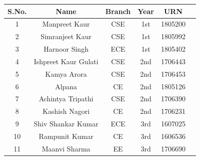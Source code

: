 \documentclass[12pt, a4 paper]{article}
\begin{document}
\begin{table}[h!]
  \begin{center}
    \begin{tabular}{|c|c|c|c|c|c|} 
    \toprule %
      \textbf{S.No.} & \textbf{Name} & \textbf{Branch} & \textbf{Year} & \textbf{URN}\\
      \midrule %
1       &Manpreet Kaur  &CSE    &1st    &1805200\\
2       &Simranjeet Kaur        &CSE    &1st    &1805992\\
3       &Harnoor Singh  &ECE    &1st    &1805402\\
4       &Ishpreet Kaur Gulati   &CSE    &2nd    &1706443\\
5       &Kamya Arora    &CSE    &2nd    &1706453\\
6       &Alpana &CE     &2nd    &1805126\\
7       &Achintya Tripathi      &CSE    &2nd    &1706390\\
8       &Kashish Nagori         &CE     &2nd    &1706231\\
9       &Shiv Shankar Kumar     &ECE    &3rd    &1607025\\
10      &Rampunit Kumar         &CE     &3rd    &1606536\\
11      &Maanvi Sharma  &EE     &3rd    &1706690\\
 \bottomrule %
    \end{tabular}
  \end{center}
\end{table}
\end{document}
